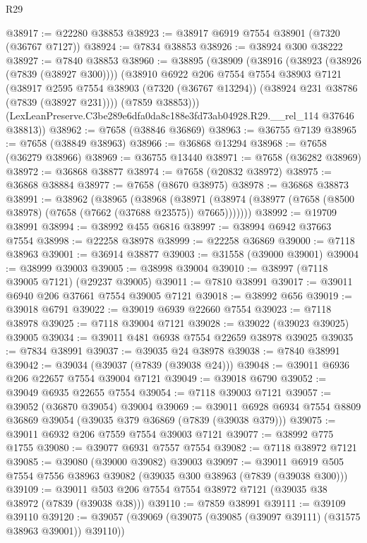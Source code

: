 \begin{lexlean}{R29}
\begin{coremodule}
@38917 := @22280 @38853
@38923 := @38917 @6919 @7554 @38901 (@7320 (@36767 @7127))
@38924 := @7834 @38853
@38926 := @38924 @300 @38222
@38927 := @7840 @38853
@38960 := @38895
    (@38909
      (@38916
        (@38923 (@38926 (@7839 (@38927 @300))))
        (@38910
          @6922
          @206
          @7554
          @7554
          @38903
          @7121
          (@38917
            @2595
            @7554
            @38903
            (@7320 (@36767 @13294))
            (@38924 @231 @38786 (@7839 (@38927 @231))))
          (@7859 @38853)))
      (LexLeanPreserve.C3be289e6dfa0da8c188e3fd73ab04928.R29.__rel_114 @37646 @38813))
@38962 := @7658 (@38846 @36869)
@38963 := @36755 @7139
@38965 := @7658 (@38849 @38963)
@38966 := @36868 @13294
@38968 := @7658 (@36279 @38966)
@38969 := @36755 @13440
@38971 := @7658 (@36282 @38969)
@38972 := @36868 @38877
@38974 := @7658 (@20832 @38972)
@38975 := @36868 @38884
@38977 := @7658 (@8670 @38975)
@38978 := @36868 @38873
@38991 := @38962
    (@38965
      (@38968
        (@38971 (@38974 (@38977 (@7658 (@8500 @38978) (@7658 (@7662 (@37688 @23575)) @7665)))))))
@38992 := @19709 @38991
@38994 := @38992 @455 @6816
@38997 := @38994 @6942 @37663 @7554
@38998 := @22258 @38978
@38999 := @22258 @36869
@39000 := @7118 @38963
@39001 := @36914 @38877
@39003 := @31558 (@39000 @39001)
@39004 := @38999 @39003
@39005 := @38998 @39004
@39010 := @38997 (@7118 @39005 @7121) (@29237 @39005)
@39011 := @7810 @38991
@39017 := @39011 @6940 @206 @37661 @7554 @39005 @7121
@39018 := @38992 @656
@39019 := @39018 @6791
@39022 := @39019 @6939 @22660 @7554
@39023 := @7118 @38978
@39025 := @7118 @39004 @7121
@39028 := @39022 (@39023 @39025) @39005
@39034 := @39011 @481 @6938 @7554 @22659 @38978 @39025
@39035 := @7834 @38991
@39037 := @39035 @24 @38978
@39038 := @7840 @38991
@39042 := @39034 (@39037 (@7839 (@39038 @24)))
@39048 := @39011 @6936 @206 @22657 @7554 @39004 @7121
@39049 := @39018 @6790
@39052 := @39049 @6935 @22655 @7554
@39054 := @7118 @39003 @7121
@39057 := @39052 (@36870 @39054) @39004
@39069 := @39011 @6928 @6934 @7554 @8809 @36869 @39054 (@39035 @379 @36869 (@7839 (@39038 @379)))
@39075 := @39011 @6932 @206 @7559 @7554 @39003 @7121
@39077 := @38992 @775 @1755
@39080 := @39077 @6931 @7557 @7554
@39082 := @7118 @38972 @7121
@39085 := @39080 (@39000 @39082) @39003
@39097 := @39011 @6919 @505 @7554 @7556 @38963 @39082 (@39035 @300 @38963 (@7839 (@39038 @300)))
@39109 := @39011 @503 @206 @7554 @7554 @38972 @7121 (@39035 @38 @38972 (@7839 (@39038 @38)))
@39110 := @7859 @38991
@39111 := @39109 @39110
@39120 := @39057 (@39069 (@39075 (@39085 (@39097 @39111) (@31575 @38963 @39001)) @39110))

\end{coremodule}
\end{lexlean}
